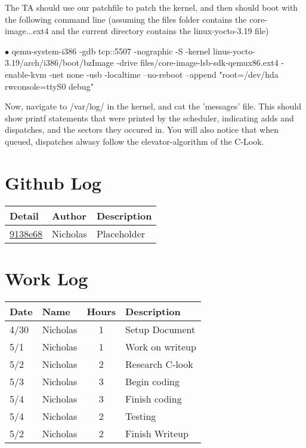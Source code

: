 \documentclass[letterpaper,10pt,fleqn,draftclsnofoot,onecolumn]{IEEEtran}
\begin{document}
	The TA should use our patchfile to patch the kernel, and then should boot with the following command line (assuming the files folder contains the core-image...ext4 and the current directory contains the linux-yocto-3.19 file)
	
	$\bullet$ qemu-system-i386 -gdb tcp::5507 -nographic -S -kernel linus-yocto-3.19/arch/i386/boot/bzImage -drive files/core-image-lsb-sdk-qemux86.ext4 -enable-kvm -net none -usb -localtime --no-reboot --append "root=/dev/hda rwconsole=ttyS0 debug"
	
	Now, navigate to /var/log/ in the kernel, and cat the 'messages' file. This should show printf statements that were printed by the scheduler, indicating adds and dispatches, and the sectors they occured in. You will also notice that when queued, dispatches alwasy follow the elevator-algorithm of the C-Look.
	 
	\section*{ Github Log }
	\begin{tabular}{l l p{1.5in}}\textbf{Detail} & \textbf{Author} & \textbf{Description}\\\hline
		\href{https://github.com/Skinnern/CS444/commit/9138e6857021329354027c49c35fea1604fd5585}{9138e68} & Nicholas & Placeholder\\\hline
	\end{tabular}
	
	
	\section*{Work Log}
	\begin{tabular}{l l c p{1.1in}}\textbf{Date} & \textbf{Name} & \textbf{Hours} & \textbf{Description}\\\hline
		4/30 & Nicholas & 1 & Setup Document\\\hline
		5/1 & Nicholas & 1 & Work on writeup\\\hline
		5/2 & Nicholas & 2 & Research C-look\\\hline
		5/3 & Nicholas & 3 & Begin coding\\\hline
		5/4 & Nicholas & 3 & Finish coding\\\hline
		5/4 & Nicholas & 2 & Testing\\\hline
		5/2 & Nicholas & 2 & Finish Writeup\\\hline
	\end{tabular}
		
	
\end{document}
